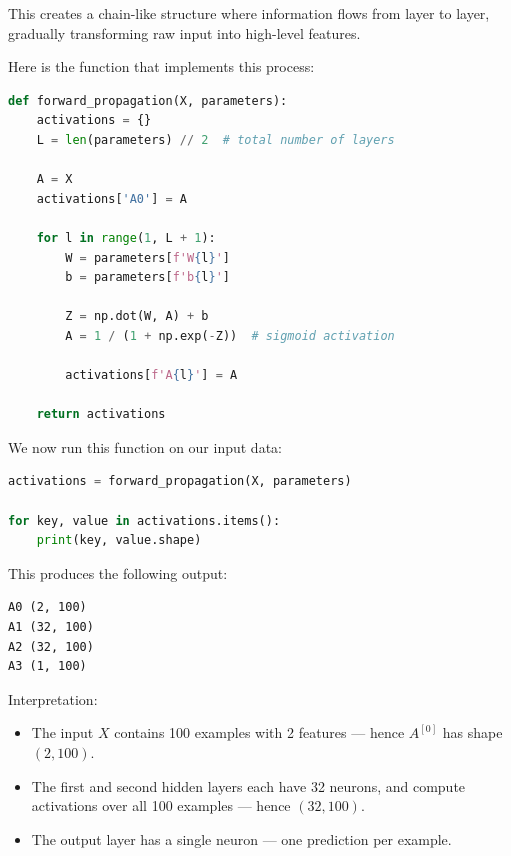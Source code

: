 \documentclass[11pt]{article}
\begin{document}
\bigskip

This creates a chain-like structure where information flows from layer to layer, gradually transforming raw input into high-level features.

\medskip

Here is the function that implements this process:

\vspace{0.5em}
\begin{lstlisting}[language=Python, frame=single, caption=Forward propagation through all layers, basicstyle=\ttfamily\small]
def forward_propagation(X, parameters):
    activations = {}
    L = len(parameters) // 2  # total number of layers

    A = X
    activations['A0'] = A

    for l in range(1, L + 1):
        W = parameters[f'W{l}']
        b = parameters[f'b{l}']

        Z = np.dot(W, A) + b
        A = 1 / (1 + np.exp(-Z))  # sigmoid activation

        activations[f'A{l}'] = A

    return activations
\end{lstlisting}

\bigskip

We now run this function on our input data:

\vspace{0.5em}
\begin{lstlisting}[language=Python, frame=single, basicstyle=\ttfamily\small]
activations = forward_propagation(X, parameters)

for key, value in activations.items():
    print(key, value.shape)
\end{lstlisting}

\medskip

This produces the following output:

\begin{verbatim}
A0 (2, 100)
A1 (32, 100)
A2 (32, 100)
A3 (1, 100)
\end{verbatim}

\bigskip

\noindent Interpretation:
\begin{itemize}
  \item The input $X$ contains 100 examples with 2 features — hence $A^{[0]}$ has shape $(2, 100)$.
  \item The first and second hidden layers each have 32 neurons, and compute activations over all 100 examples — hence $(32, 100)$.
  \item The output layer has a single neuron — one prediction per example.
\end{itemize}
\end{document}
